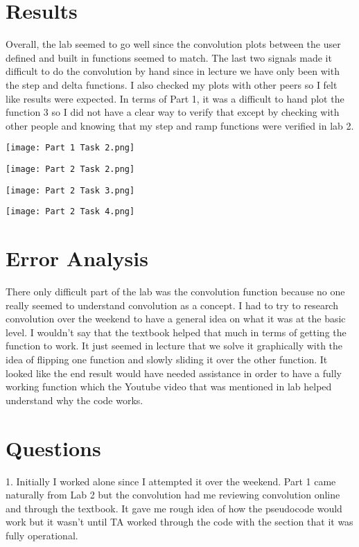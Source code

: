 \documentclass[12pt]{report}
\begin{document}
\section{Results}

Overall, the lab seemed to go well since the convolution plots between the user defined and built in functions seemed to match. The last two signals made it difficult to do the convolution by hand since in lecture we have only been with the step and delta functions. I also checked my plots with other peers so I felt like results were expected. In terms of Part 1, it was a difficult to hand plot the function 3 so I did not have a clear way to verify that except by checking with other people and knowing that my step and ramp functions were verified in lab 2. 

\texttt{[image: Part 1 Task 2.png]}
  
\texttt{[image: Part 2 Task 2.png]}

\texttt{[image: Part 2 Task 3.png]}

\texttt{[image: Part 2 Task 4.png]}



\section{Error Analysis}

There only difficult part of the lab was the convolution function because no one really seemed to understand convolution as a concept. I had to try to research convolution over the weekend to have a general idea on what it was at the basic level. I wouldn't say that the textbook helped that much in terms of getting the function to work. It just seemed in lecture that we solve it graphically with the idea of flipping one function and slowly sliding it over the other function. It looked like the end result would have needed assistance in order to have a fully working function which the Youtube video that was mentioned in lab helped understand why the code works. 

\section{Questions}

1. Initially I worked alone since I attempted it over the weekend. Part 1 came naturally from Lab 2 but the convolution had me reviewing convolution online and through the textbook. It gave me rough idea of how the pseudocode would work but it wasn't until TA worked through the code with the section that it was fully operational. 
\pagebreak
\end{document}
